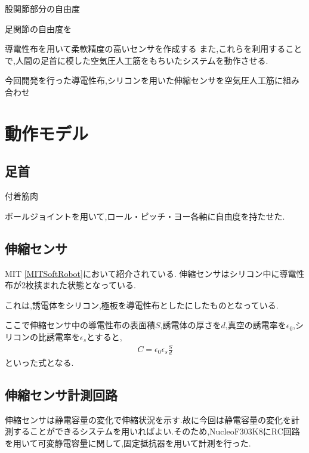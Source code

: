 股関節部分の自由度

足関節の自由度を

導電性布を用いて柔軟精度の高いセンサを作成する
また,これらを利用することで,人間の足首に模した空気圧人工筋をもちいたシステムを動作させる.

今回開発を行った導電性布,シリコンを用いた伸縮センサを空気圧人工筋に組み合わせ
\section{動作モデル}
\subsection{足首}
付着筋肉

ボールジョイントを用いて,ロール・ピッチ・ヨー各軸に自由度を持たせた.
\subsection{伸縮センサ}
MIT \ref{MITSoftRobot}において紹介されている.
伸縮センサはシリコン中に導電性布が2枚挟まれた状態となっている.

これは,誘電体をシリコン,極板を導電性布としたにしたものとなっている.

ここで伸縮センサ中の導電性布の表面積$S$,誘電体の厚さを$d$,真空の誘電率を$\epsilon{}_0$,シリコンの比誘電率を$\epsilon{}_s$とすると,
\begin{eqnarray}
    C=\epsilon{}_0\epsilon{}_s\frac{S}{d}
\end{eqnarray}
といった式となる.
\subsection{伸縮センサ計測回路}
伸縮センサは静電容量の変化で伸縮状況を示す.故に今回は静電容量の変化を計測することができるシステムを用いればよい.そのため,NucleoF303K8にRC回路を用いて可変静電容量に関して,固定抵抗器を用いて計測を行った.

